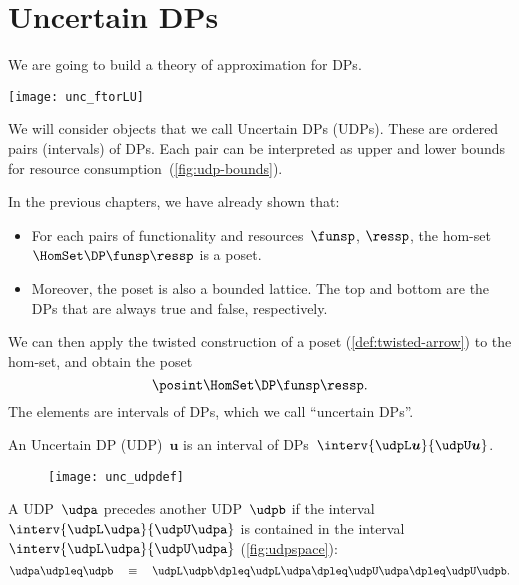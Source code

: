 \section{Uncertain DPs}

We are going to build a theory of approximation for DPs.

\begin{marginfigure}
    \texttt{[image: unc\_ftorLU]}
    \caption{}
    \label{fig:udp-bounds}
\end{marginfigure}

We will consider objects that we call Uncertain DPs (UDPs).
These are ordered pairs (intervals) of DPs.
Each pair can be interpreted as upper and lower bounds for resource consumption~(\cref{fig:udp-bounds}).


In the previous chapters, we have already shown that:
\begin{itemize}
    \item For each pairs of functionality and resources~$\funsp$, $\ressp$, the hom-set~$\HomSet\DP\funsp\ressp$
          is a poset.
    \item Moreover, the poset is also a bounded lattice.
          The top and bottom are the DPs that are always true and false, respectively.
\end{itemize}

We can then apply the twisted construction of a poset (\cref{def:twisted-arrow}) to the hom-set, and obtain the poset
\begin{equation}
    \posint \HomSet\DP\funsp\ressp.
\end{equation}
%
The elements are intervals of DPs, which we call ``uncertain DPs''.

\begin{definition}\label{def:uncertain-dp}
    An Uncertain DP (UDP)~$\boldsymbol{u}$ is an interval of DPs~$\interv{\udpL\boldsymbol{u}}{\udpU\boldsymbol{u}}$.
\end{definition}

\begin{figure}[h!]
    \texttt{[image: unc\_udpdef]}
    \caption{}
\end{figure}

\begin{definition}
    \label{def:udpleq}
    A UDP~$\udpa$ precedes another UDP~$\udpb$ if the interval~$\interv{\udpL\udpa}{\udpU\udpa}$
    is contained in the interval~$\interv{\udpL\udpa}{\udpU\udpa}$ (\cref{fig:udpspace}):
    \begin{equation}
        \udpa\udpleq\udpb\quad\equiv\quad\udpL\udpb\dpleq\udpL\udpa\dpleq\udpU\udpa\dpleq\udpU\udpb.
    \end{equation}
\end{definition}

